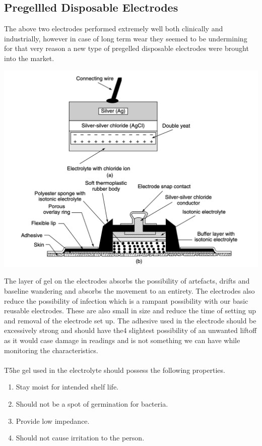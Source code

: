 \documentclass{article}
\begin{document}
\subsection{Pregellled Disposable Electrodes}
The above two electrodes performed extremely well both clinically and industrially, however in case of long term wear they seemed to be undermining for that very reason a new type of pregelled disposable electrodes were brought into the market.
\begin{center}
    \includegraphics[scale=0.4]{Screenshot 2023-05-01 at 2.27.36 PM.png}
\end{center}
The layer of gel on the electrodes absorbs the possibility of artefacts, drifts and baseline wandering and absorbs the movement to an entirety. The electrodes also reduce the possibility of infection which is a rampant possibility with our basic reusable electrodes. These are also small in size and reduce the time of setting up and removal of the electrode set up. The adhesive used in the electrode should be excessively strong and should have the4 slightest possibility of an unwanted liftoff as it would case damage in readings and is not something we can have while monitoring the characteristics.\\
\\
T5he gel used in the electrolyte should possess the following properties.
\begin{enumerate}
    \item Stay moist for intended shelf life.
    \item Should not be a spot of germination for bacteria.
    \item Provide low impedance.
    \item Should not cause irritation to the person.
\end{enumerate}
\end{document}

